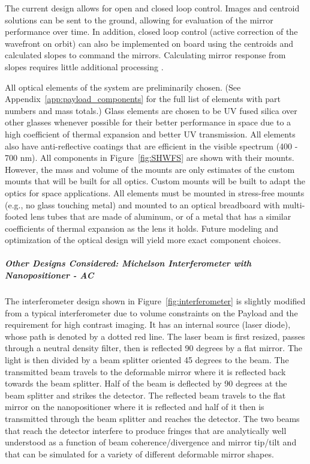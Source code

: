 \documentclass[12pt]{article}
\begin{document}
The current design allows for open and closed loop control.  Images and centroid solutions can be sent to the ground, allowing for evaluation of the mirror performance over time.  In addition, closed loop control (active correction of the wavefront on orbit) can also be implemented on board using the centroids and calculated slopes to command the mirrors.  Calculating mirror response from slopes requires little additional processing \cite{centroids}. 

All optical elements of the system are preliminarily chosen.
(See Appendix~\ref{app:payload_components} for the full list of
elements with part numbers and mass totals.)  Glass elements are
chosen to be UV fused silica over other glasses whenever possible for
their better performance in space \cite{radiation_optics} due to a
high coefficient of thermal expansion and better UV transmission.  All
elements also have anti-reflective coatings that are efficient in the
visible spectrum (400 - 700 nm).  All components in Figure~\ref{fig:SHWFS} are shown with their mounts.  However, the mass and volume of the mounts are only estimates of the custom mounts that will be built for all optics.  Custom mounts will be built to adapt the optics for space applications.  All elements must be mounted in stress-free mounts (e.g., no glass touching metal) and mounted to an optical breadboard with multi-footed lens tubes that are made of aluminum, or of a metal that has a similar coefficients of thermal expansion as the lens it holds.  Future modeling and optimization of the optical design will yield more exact component choices.

\subparagraph{Other Designs Considered: Michelson Interferometer with Nanopositioner - AC}\label{sec:payload_interferometer}
The interferometer design shown in Figure~\ref{fig:interferometer} is slightly modified from a typical interferometer due to volume constraints on the Payload and the requirement for high contrast imaging. It has an internal source (laser diode), whose path is denoted by a dotted red line.
The laser beam is first resized, passes through a neutral density filter, then is reflected 90 degrees by a
flat mirror. The light is then divided by a beam splitter oriented 45
degrees to the beam. The transmitted beam travels to the deformable
mirror where it is reflected back towards the beam splitter. Half of
the beam is deflected by 90 degrees at the beam splitter and strikes
the detector. The reflected beam travels to the flat mirror on the
nanopositioner where it is reflected and half of it then is transmitted
through the beam splitter and reaches the detector. The two beams that
reach the detector interfere to produce fringes \cite{traeger} that are analytically well understood as a function of beam coherence/divergence and mirror tip/tilt \cite{demtroeder} and that can be simulated for a variety of different deformable mirror shapes.
\end{document}
